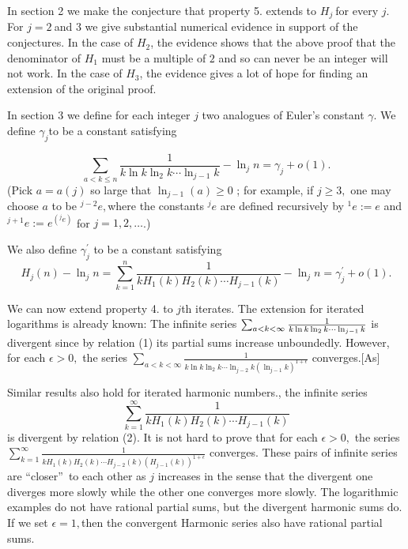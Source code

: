\documentclass{article}
\begin{document}
In section 2 we make the conjecture that property 5. extends to $H_{j}\ $for
every $j$. For $j=2\ $and $3$ we give substantial numerical evidence in
support of the conjectures. In the case of $H_{2}$, the evidence shows that
the above proof that the denominator of $H_{1}$ must be a multiple of $2$
and so can never be an integer will not work. In the case of $H_{3}$, the
evidence gives a lot of hope for finding an extension of the original proof.

In section 3 we define for each integer $j$ two analogues of Euler's
constant $\gamma $. We define $\gamma _{j}$to be a constant satisfying

\begin{equation}
\sum_{a<k\leq n}\frac{1}{k\ln k\ln _{2}k\cdots \ln _{j-1}k}-\ln _{j}n=\gamma
_{j}+o\left( 1\right) .  \tag{1}  \label{1}
\end{equation}%
(Pick $a=a\left( j\right) $ so large that $\ln _{j-1}\left( a\right) \geq 0$%
; for example, if $j\geq 3,$ one may choose $a$ to be $^{j-2}e,$where the
constants  $^{j}e$ are defined recursively by $^{1}e:=e$ and $%
^{j+1}e:=e^{(^{j}e)}$ for $j=1,2,\dots $.)

We also define $\gamma _{j}^{\prime }$ to be a constant satisfying 
\begin{equation}
H_{j}\left( n\right) -\ln _{j}n=\sum_{k=1}^{n}\frac{1}{kH_{1}\left( k\right)
H_{2}\left( k\right) \cdots H_{j-1}\left( k\right) }-\ln _{j}n=\gamma
_{j}^{\prime }+o\left( 1\right) .  \tag{2}  \label{2}
\end{equation}

We can now extend property 4. to $j$th iterates. The extension for iterated
logarithms is already known: The infinite series $\sum_{a<k<\infty }\frac{1}{%
k\ln k\ln _{2}k\cdots \ln _{j-1}k}$ is divergent since by relation (1) its
partial sums increase unboundedly. However, for each $\epsilon >0,$ the
series $\sum_{a<k<\infty }\frac{1}{k\ln k\ln _{2}k\cdots \ln _{j-2}k\left(
\ln _{j-1}k\right) ^{1+\epsilon }}$ converges.[As] 

Similar results also hold for iterated harmonic numbers., the infinite
series 
\[
\sum_{k=1}^{\infty }\frac{1}{kH_{1}\left( k\right) H_{2}\left( k\right)
\cdots H_{j-1}\left( k\right) }
\]
is divergent by relation (2). It is not hard to prove that for each $%
\epsilon >0,$ the series $\sum_{k=1}^{\infty }\frac{1}{kH_{1}\left( k\right)
H_{2}\left( k\right) \cdots H_{j-2}\left( k\right) \left( H_{j-1}\left(
k\right) \right) ^{1+\epsilon }}$ converges. These pairs of infinite series
are \textquotedblleft closer\textquotedblright\ to each other as $j$
increases in the sense that the divergent one diverges more slowly while the
other one converges more slowly. The logarithmic examples do not have
rational partial sums, but the divergent harmonic sums do. If we set $%
\epsilon =1,$then the convergent Harmonic series also have rational partial
sums. 
\end{document}
